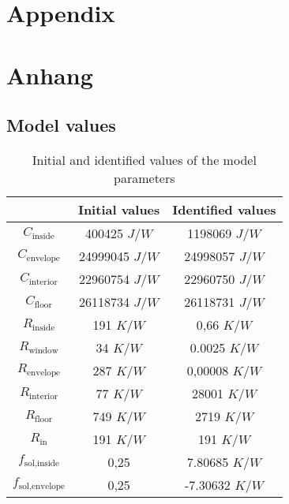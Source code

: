 

{\chapter{Appendix}}    %
{\chapter{Anhang}}      %
\label{chap:appendix}

\section{Model values}
\label{sec:appendix:Modelvalues}
\begin{table}[!]
    \centering
    \begin{tabular}{c|c|c}
         &  Initial values & Identified values\\
         \hline
        $C_\text{inside}$& 400425 $J/W$ & 1198069 $J/W$\\
        $C_\text{envelope}$ & 24999045 $J/W$ & 24998057 $J/W$\\
        $C_\text{interior}$& 22960754 $J/W$ & 22960750 $J/W$\\
        $C_\text{floor}$ & 26118734 $J/W$ & 26118731 $J/W$\\
        $R_\text{inside}$ & 191 $K/W$ & 0,66 $K/W$\\
        $R_\text{window}$ & 34 $K/W$ & 0.0025 $K/W$\\
        $R_\text{envelope}$ & 287 $K/W$ & 0,00008 $K/W$\\
        $R_\text{interior}$& 77 $K/W$ & 28001 $K/W$\\
        $R_\text{floor}$ & 749 $K/W$ & 2719 $K/W$\\
        $R_\text{in}$ & 191 $K/W$ & 191 $K/W$\\
        $f_\text{sol,inside}$ & 0,25 & 7.80685 $K/W$\\
        $f_\text{sol,envelope}$ &0,25 & -7.30632 $K/W$\\
    \end{tabular}
    \caption{Initial and identified values of the model parameters}
    \label{tab:my_label}
\end{table}
